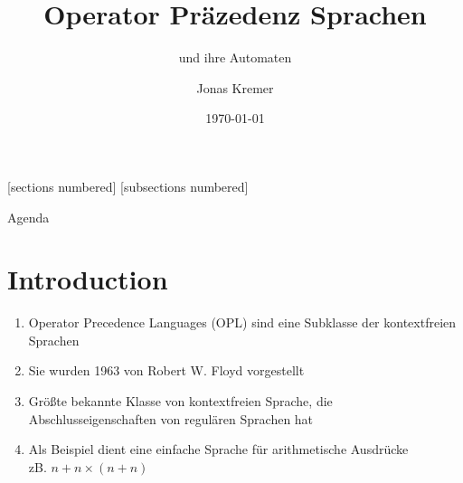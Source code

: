 \documentclass[
10pt,
pantone315, 	%
]{beamer}
\begin{document}
\date{\today}
\author{Jonas Kremer}
\title{Operator Präzedenz Sprachen}
\subtitle{und ihre Automaten}

[sections numbered]
[subsections numbered]


\begin{frame}[plain]
  \maketitle
\end{frame}

\begin{frame}[t]{Agenda}
\end{frame}

\section{Introduction}
\begin{frame}[t]{\secname}
	\begin{enumerate}[<+->]
		\item
		Operator Precedence Languages (OPL) sind eine Subklasse der kontextfreien Sprachen
		\item
		Sie wurden 1963 von Robert W. Floyd vorgestellt
		\item
		Größte bekannte Klasse von kontextfreien Sprache, die Abschlusseigenschaften von regulären Sprachen hat
		\item 
		Als Beispiel dient eine einfache Sprache für arithmetische Ausdrücke\\
		zB. $ n + n \times (n + n)$
	\end{enumerate}	
\end{frame}
\end{document}
